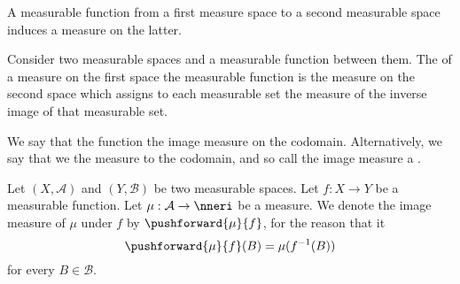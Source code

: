 
\sbasic

































\sstart
{}


A measurable
function from
a first measure space
to a second measurable space
induces a measure
on the latter.


Consider two measurable
spaces and a measurable
function between them.
The
of a measure on the first space
the measurable function
is the measure on the second space
which assigns to each measurable set
the measure of the inverse image of
that measurable set.

We say that the
function
the image measure
on the
codomain.
Alternatively,
we say that we
the measure to the
codomain, and so
call the image
measure
a
.


Let
$(X, \mathcal{A})$
and
$(Y, \mathcal{B})$
be two measurable spaces.
Let $f: X \to Y$ be
a measurable function.
Let
$\mu: \mathcal{A} \to \nneri$
be a measure.
We denote the
image measure of $\mu$
under $f$ by
$\pushforward{\mu}{f}$,
for the reason that it
\[
  \pushforward{\mu}{f}(B) = \mu(f^{-1}(B))
\]
for every $B \in \mathcal{B}$.


